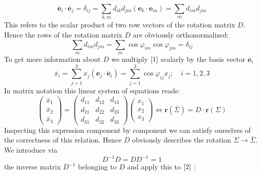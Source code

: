 \documentclass[12pt]{book}
\theoremstyle{definition}\newtheorem{dfn}{Définition}[chapter]
\theoremstyle{plain}\newtheorem{thm}{Théorème}[chapter]
\theoremstyle{plain}\newtheorem{prp}{Proposition}[chapter]
\theoremstyle{plain}\newtheorem{lem}{\bf Lemme}[chapter]
\theoremstyle{plain}\newtheorem{axm}{\bf Axiome}[chapter]
\theoremstyle{plain}\newtheorem{lmm}{\bf Lemme}[chapter]
\theoremstyle{plain}\newtheorem{cor}{\bf Corollaire}[chapter]
\theoremstyle{remark}\newtheorem{rem}{Remarque}[chapter]
\begin{document}
$$
\overline{\mathbf{e}}_{i} \cdot \overline{\mathbf{e}}_{j}=\delta_{i j}=\sum_{k, m} d_{i k} d_{j m}\left(\mathbf{e}_{k} \cdot \mathbf{e}_{m}\right)=\sum_{m} d_{i m} d_{j m}
$$
This refers to the scalar product of two row vectors of the rotation matrix $D$. Hence the rows of the rotation matrix $D$ are obviously orthonormalized:
\begin{equation}
\sum_{m} d_{i m} d_{j m}=\sum_{m} \cos \varphi_{i m} \cos \varphi_{j m}=\delta_{i j}\label{4}
\end{equation}
To get more information about $D$ we multiply $\ref{1}$ scalarly by the basis vector $\overline{\mathbf{e}}_{i}$
$$
\bar{x}_{i}=\sum_{j=1}^{3} x_{j}\left(\mathbf{e}_{j} \cdot \overline{\mathbf{e}}_{i}\right)=\sum_{j=1}^{3} \cos \varphi_{i j} x_{j} ; \quad i=1,2,3
$$
In matrix notation this linear system of equations reads:
\begin{equation}
\left(\begin{array}{l}
\bar{x}_{1} \\
\bar{x}_{2} \\
\bar{x}_{3}
\end{array}\right)=\left(\begin{array}{lll}
d_{11} & d_{12} & d_{13} \\
d_{21} & d_{22} & d_{23} \\
d_{31} & d_{32} & d_{33}
\end{array}\right)\left(\begin{array}{l}
x_{1} \\
x_{2} \\
x_{3}
\end{array}\right) \Longleftrightarrow \mathbf{r}(\bar{\Sigma})=D \cdot \mathbf{r}(\Sigma)
\label{2}
\end{equation}
Inspecting this expression component by component we can satisfy ourselves of the correctness of this relation. Hence $D$ obviously describes the rotation $\Sigma \rightarrow \bar{\Sigma}$. We introduce via
\begin{equation}
D^{-1} D=D D^{-1}=\mathfrak{1}\label{3}
\end{equation}
the inverse matrix $D^{-1}$ belonging to $D$ and apply this to $\ref{2}$ :
\end{document}

